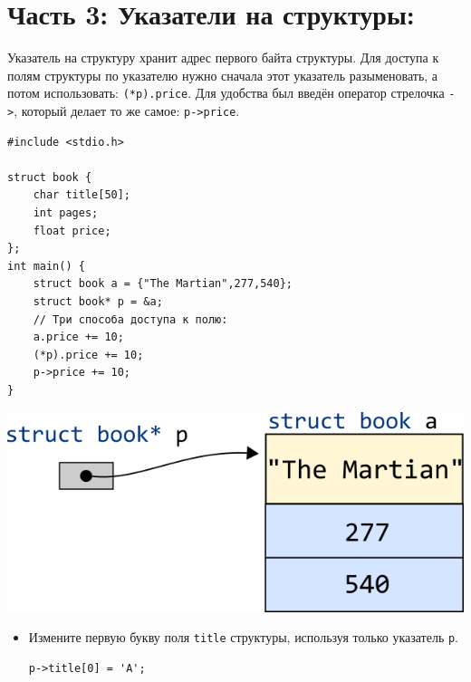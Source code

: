 \documentclass{article}
\begin{document}
\section*{Часть 3: Указатели на структуры:}
Указатель на структуру хранит адрес первого байта структуры. Для доступа к полям структуры по указателю нужно сначала этот указатель разыменовать, а потом использовать: \texttt{(*p).price}. Для удобства был введён оператор стрелочка \texttt{->}, который делает то же самое: \texttt{p->price}.
\begin{multicols}{2}
\begin{lstlisting}
#include <stdio.h>

struct book {
    char title[50];
    int pages;
    float price;
};
int main() {
    struct book a = {"The Martian",277,540};
    struct book* p = &a;
    // Три способа доступа к полю:
    a.price += 10;
    (*p).price += 10;
    p->price += 10;
}
\end{lstlisting}

\vfill\null
\columnbreak

\begin{center}
\includegraphics[scale=0.6]{../images/structpointer2.png}
\end{center}
\end{multicols}

\begin{itemize}
\item Измените первую букву поля \texttt{title} структуры, используя только указатель \texttt{p}.
\begin{lstlisting}[backgroundcolor = \color{solcolor}]
p->title[0] = 'A';
\end{lstlisting}
\end{itemize}
\end{document}
